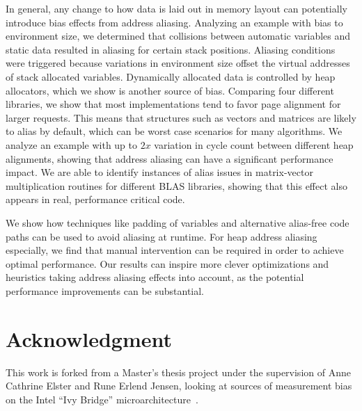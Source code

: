 \documentclass[10pt, conference, compsocconf]{IEEEtran}
\begin{document}
In general, any change to how data is laid out in memory layout can potentially introduce bias effects from address aliasing.
Analyzing an example with bias to environment size, we determined that collisions between automatic variables and static data resulted in aliasing for certain stack positions.
Aliasing conditions were triggered because variations in environment size offset the virtual addresses of stack allocated variables.
Dynamically allocated data is controlled by heap allocators, which we show is another source of bias.
Comparing four different libraries, we show that most implementations tend to favor page alignment for larger requests.
This means that structures such as vectors and matrices are likely to alias by default, which can be worst case scenarios for many algorithms.
We analyze an example with up to $2x$ variation in cycle count between different heap alignments, showing that address aliasing can have a significant performance impact.
We are able to identify instances of alias issues in matrix-vector multiplication routines for different BLAS libraries, showing that this effect also appears in real, performance critical code.

We show how techniques like padding of variables and alternative alias-free code paths can be used to avoid aliasing at runtime.
For heap address aliasing especially, we find that manual intervention can be required in order to achieve optimal performance.
Our results can inspire more clever optimizations and heuristics taking address aliasing effects into account, as the potential performance improvements can be substantial.


\section*{Acknowledgment}
This work is forked from a Master's thesis project under the supervision of Anne Cathrine Elster and Rune Erlend Jensen, looking at sources of measurement bias on the Intel ``Ivy Bridge'' microarchitecture~\cite{MasterThesis}.




\end{document}
